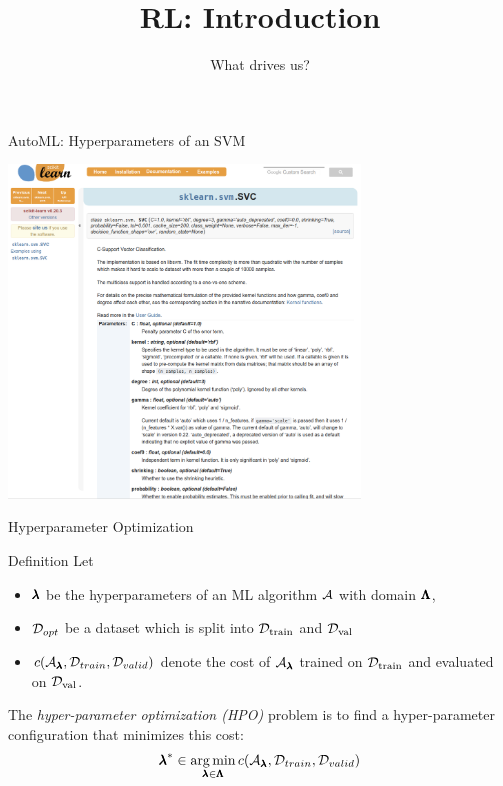 


\title[ML-RL: Big Picture]{RL: Introduction}
\subtitle{What drives us?}




	
	\maketitle

\begin{frame}[c]{AutoML: Hyperparameters of an SVM}
	
	\centering
	\includegraphics[width=0.7\textwidth]{images/sklearn_svm_doc.png}
	
\end{frame}
\begin{frame}[c]{Hyperparameter Optimization}
	
	\begin{block}{Definition}
		Let 
		\begin{itemize}
			\item $\pmb{\lambda}$ be the hyperparameters of an ML algorithm $\mathcal{A}$ with domain $\pmb{\Lambda}$,
			\pause
			\item $\mathcal{D}_{opt}$ be a dataset which is split into $\mathcal{D}_{\text{train}}$ and $\mathcal{D}_{\text{val}}$ 
			\pause
			\item $c(\mathcal{A}_{\pmb{\lambda}}, \mathcal{D}_{train}, \mathcal{D}_{valid})$ denote the cost of $\mathcal{A}_{\pmb{\lambda}}$ trained on $\mathcal{D}_{\text{train}}$ and evaluated on $\mathcal{D}_{\text{val}}$.
		\end{itemize}
		\pause
		The \emph{hyper-parameter optimization (HPO)} problem is to find a hyper-parameter configuration that minimizes this cost:
		\begin{equation}
		{\pmb{\lambda}}^* \in \operatorname*{arg\,min}_{\pmb{\lambda} \in \pmb{\Lambda}} c(\mathcal{A}_{\pmb{\lambda}}, \mathcal{D}_{train}, \mathcal{D}_{valid}) \nonumber  
		\end{equation}
	\end{block}
	
\end{frame}
